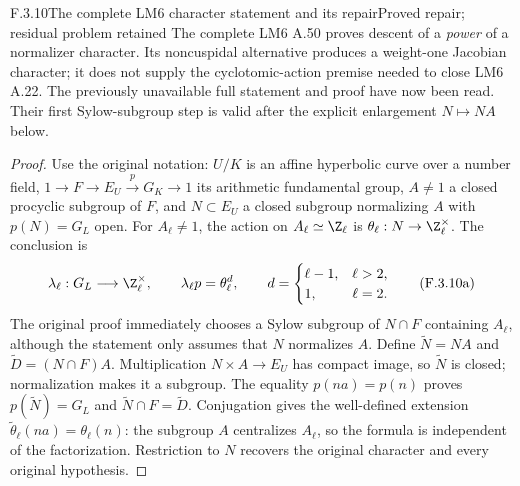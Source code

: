 \begin{result}{F.3.10}{The complete LM6 character statement and its repair}{Proved repair; residual problem retained}
The complete LM6 A.50 proves descent of a \emph{power} of a
normalizer character. Its noncuspidal alternative produces a
weight-one Jacobian character; it does not supply the
cyclotomic-action premise needed to close LM6 A.22. The
previously unavailable full statement and proof have now been
read. Their first Sylow-subgroup step is valid after the
explicit enlargement $N\mapsto NA$ below.
\end{result}
\begin{proof}
Use the original notation: $U/K$ is an affine hyperbolic curve
over a number field, $1\to F\to E_U\xrightarrow{p}G_K\to1$
its arithmetic fundamental group, $A\ne1$ a closed procyclic
subgroup of $F$, and $N\subset E_U$ a closed subgroup
normalizing $A$ with $p(N)=G_L$ open. For $A_\ell\ne1$,
the action on $A_\ell\simeq\Z_\ell$ is
$\theta_\ell:N\to\Z_\ell^\times$. The conclusion is
\[
 \lambda_\ell:G_L\longrightarrow\Z_\ell^\times,
 \qquad \lambda_\ell p=\theta_\ell^d,
 \qquad
 d=\begin{cases}\ell-1,&\ell>2,\\1,&\ell=2.\end{cases}
 \tag{F.3.10a}
\]
The original proof immediately chooses a Sylow subgroup of
$N\cap F$ containing $A_\ell$, although the statement only
assumes that $N$ normalizes $A$. Define
$\widetilde N=NA$ and $\widetilde D=(N\cap F)A$.
Multiplication $N\times A\to E_U$ has compact image, so
$\widetilde N$ is closed; normalization makes it a subgroup.
The equality $p(na)=p(n)$ proves
$p(\widetilde N)=G_L$ and
$\widetilde N\cap F=\widetilde D$. Conjugation gives the
well-defined extension
$\widetilde\theta_\ell(na)=\theta_\ell(n)$: the subgroup
$A$ centralizes $A_\ell$, so the formula is independent of
the factorization. Restriction to $N$ recovers the original
character and every original hypothesis.


\end{proof}
